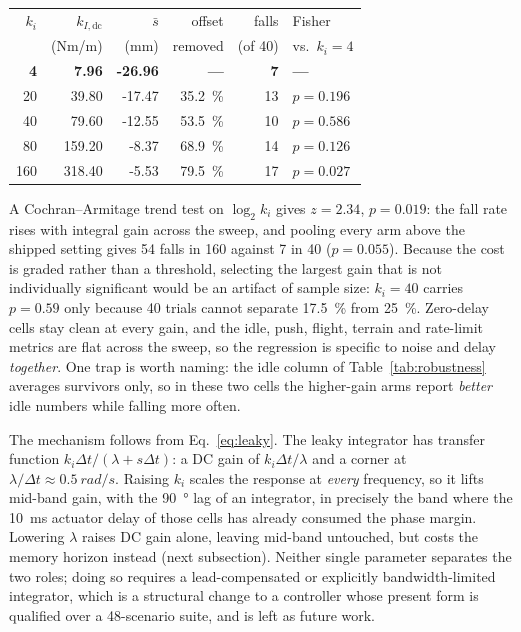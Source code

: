 \documentclass[conference]{IEEEtran}
\begin{document}
\begin{center}\footnotesize
\begin{tabular}{rrrrrl}
\hline
$k_i$ & $k_{I,\text{dc}}$ & $\bar{s}$ & offset & falls & Fisher \\
 & (Nm/m) & (mm) & removed & (of 40) & vs.\ $k_i{=}4$ \\
\hline
\textbf{4} & \textbf{7.96} & \textbf{-26.96} & \textbf{---} & \textbf{7} & \textbf{---} \\
20 & 39.80 & -17.47 & \SI{35.2}{\percent} & 13 & $p{=}0.196$ \\
40 & 79.60 & -12.55 & \SI{53.5}{\percent} & 10 & $p{=}0.586$ \\
80 & 159.20 & -8.37 & \SI{68.9}{\percent} & 14 & $p{=}0.126$ \\
160 & 318.40 & -5.53 & \SI{79.5}{\percent} & 17 & $p{=}0.027$ \\
\hline
\end{tabular}
\end{center}

A Cochran--Armitage trend test on $\log_2 k_i$ gives $z{=}2.34$, $p{=}0.019$:
the fall rate rises with integral gain across the sweep, and pooling every
arm above the shipped setting gives \num{54} falls in \num{160} against
\num{7} in \num{40} ($p{=}0.055$). Because the cost is graded rather than a
threshold, selecting the largest gain that is not individually significant
would be an artifact of sample size: $k_i{=}40$ carries $p{=}0.59$ only
because \num{40} trials cannot separate \SI{17.5}{\percent} from
\SI{25}{\percent}. Zero-delay cells stay clean at every gain, and the idle,
push, flight, terrain and rate-limit metrics are flat across the sweep, so
the regression is specific to noise and delay \emph{together}. One trap is
worth naming: the idle column of Table~\ref{tab:robustness} averages
survivors only, so in these two cells the higher-gain arms report
\emph{better} idle numbers while falling more often.

The mechanism follows from Eq.~\eqref{eq:leaky}. The leaky integrator has
transfer function $k_i\Delta t/(\lambda + s\Delta t)$: a DC gain of
$k_i\Delta t/\lambda$ and a corner at $\lambda/\Delta t\approx\SI{0.5}{rad/s}$.
Raising $k_i$ scales the response at \emph{every} frequency, so it lifts mid-band gain, with the \SI{90}{\degree} lag of an integrator, in precisely the band where the \SI{10}{ms} actuator delay of those cells has already
consumed the phase margin. Lowering $\lambda$ raises DC gain alone, leaving mid-band
untouched, but costs the memory horizon instead (next subsection). Neither
single parameter separates the two roles; doing so requires a lead-compensated
or explicitly bandwidth-limited integrator, which is a structural change to a
controller whose present form is qualified over a \num{48}-scenario suite, and
is left as future work.
\end{document}
